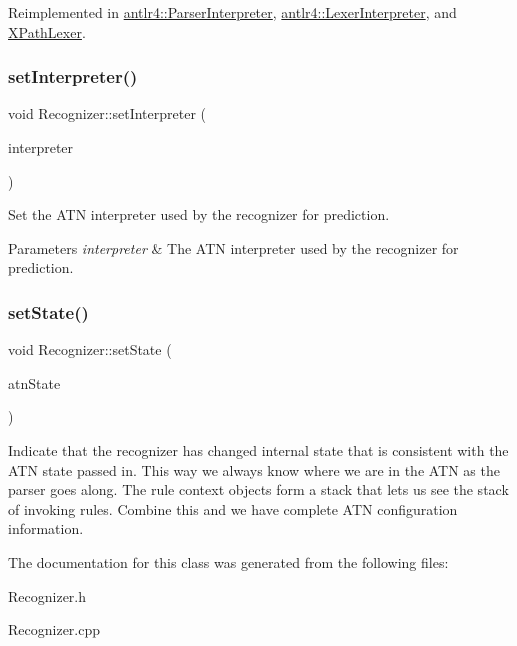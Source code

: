 Reimplemented in \hyperlink{classantlr4_1_1ParserInterpreter_af8009dbf9445325303ebc59350a7d137}{antlr4\+::\+Parser\+Interpreter}, \hyperlink{classantlr4_1_1LexerInterpreter_addd24350f968e05ba45f2c8490b16e9e}{antlr4\+::\+Lexer\+Interpreter}, and \hyperlink{classXPathLexer_acf45ddece8356cd0fcaa1189687c1f64}{X\+Path\+Lexer}.

\mbox{\label{classantlr4_1_1Recognizer_a8f7a89b06fda4ea78ac341c812f80551}} 
\subsubsection{\texorpdfstring{set\+Interpreter()}{setInterpreter()}}
{\footnotesize\ttfamily void Recognizer\+::set\+Interpreter (\begin{DoxyParamCaption}\item[{\hyperlink{classantlr4_1_1atn_1_1ATNSimulator}{atn\+::\+A\+T\+N\+Simulator} $\ast$}]{interpreter }\end{DoxyParamCaption})}

Set the A\+TN interpreter used by the recognizer for prediction.


\begin{DoxyParams}{Parameters}
{\em interpreter} & The A\+TN interpreter used by the recognizer for prediction. \\
\hline
\end{DoxyParams}
\mbox{\label{classantlr4_1_1Recognizer_a01f30b45ab12a03262826e23382c8a89}} 
\subsubsection{\texorpdfstring{set\+State()}{setState()}}
{\footnotesize\ttfamily void Recognizer\+::set\+State (\begin{DoxyParamCaption}\item[{size\+\_\+t}]{atn\+State }\end{DoxyParamCaption})}



Indicate that the recognizer has changed internal state that is consistent with the A\+TN state passed in. This way we always know where we are in the A\+TN as the parser goes along. The rule context objects form a stack that lets us see the stack of invoking rules. Combine this and we have complete A\+TN configuration information. 



The documentation for this class was generated from the following files\+:\begin{DoxyCompactItemize}
\item 
Recognizer.\+h\item 
Recognizer.\+cpp\end{DoxyCompactItemize}
